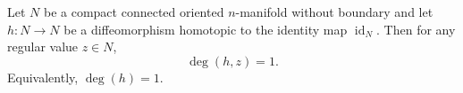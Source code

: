 Let $N$ be a compact connected oriented $n$-manifold without boundary and let $h: N \to N$ be a diffeomorphism homotopic to the identity map $\operatorname{id}_N$. Then for any regular value $z \in N$,
$$
\deg(h, z) = 1.
$$
Equivalently, $\deg(h) = 1$.
